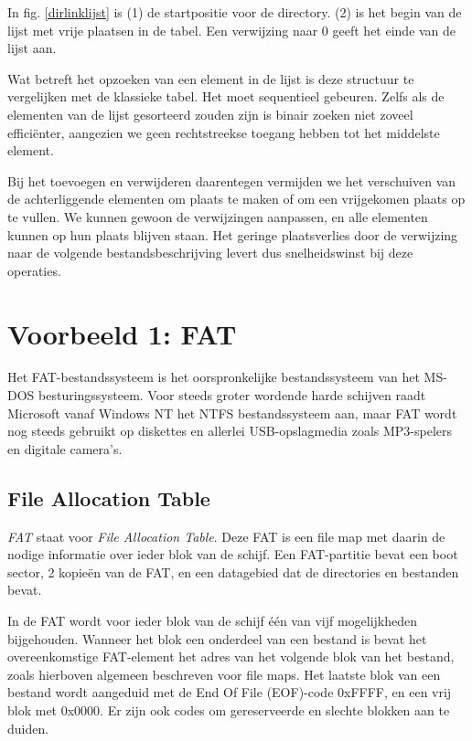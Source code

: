 In fig. \ref{dirlinklijst} is (1) de startpositie voor de directory. (2) is het begin van de lijst met vrije plaatsen in de tabel. Een verwijzing naar 0 geeft het einde van de lijst aan.

Wat betreft het opzoeken van een element in de lijst is deze
structuur te vergelijken met de klassieke tabel. Het moet sequentieel
gebeuren. Zelfs als de elementen van de lijst gesorteerd zouden zijn
is binair zoeken niet zoveel effici\"enter, aangezien we geen
rechtstreekse toegang hebben tot het middelste element.

Bij het toevoegen en verwijderen daarentegen vermijden we het
verschuiven van de achterliggende elementen om plaats te maken of om
een vrijgekomen plaats op te vullen. We kunnen gewoon de verwijzingen
aanpassen, en alle elementen kunnen op hun plaats blijven staan. Het
geringe plaatsverlies door de verwijzing naar de volgende
bestandsbeschrijving levert dus snelheidswinst bij deze
operaties.

\section{Voorbeeld 1: FAT}

Het FAT-bestandssysteem is het oorspronkelijke bestandssysteem van
het MS-DOS besturingssysteem. Voor steeds groter wordende harde schijven
raadt Microsoft vanaf Windows NT het NTFS bestandssysteem aan, maar FAT
wordt nog steeds gebruikt op diskettes en allerlei USB-opslagmedia zoals
MP3-spelers en digitale camera's.

\subsection{File Allocation Table}

\emph{FAT} staat voor \emph{File Allocation
Table}. Deze FAT is een file map met daarin de nodige
informatie over ieder blok van de schijf. Een FAT-partitie bevat een
boot sector, 2 kopie\"en van de FAT, en een datagebied dat de
directories en bestanden bevat.

In de FAT wordt voor ieder blok van de schijf \'e\'en van vijf
mogelijkheden bijgehouden. Wanneer het blok een onderdeel van een
bestand is bevat het overeenkomstige FAT-element het adres van het
volgende blok van het bestand, zoals hierboven algemeen beschreven
voor file maps. Het laatste blok van een bestand wordt aangeduid met
de End Of File (EOF)-code 0xFFFF, en een vrij blok met 0x0000. Er zijn
ook codes om gereserveerde en slechte blokken aan te duiden.

